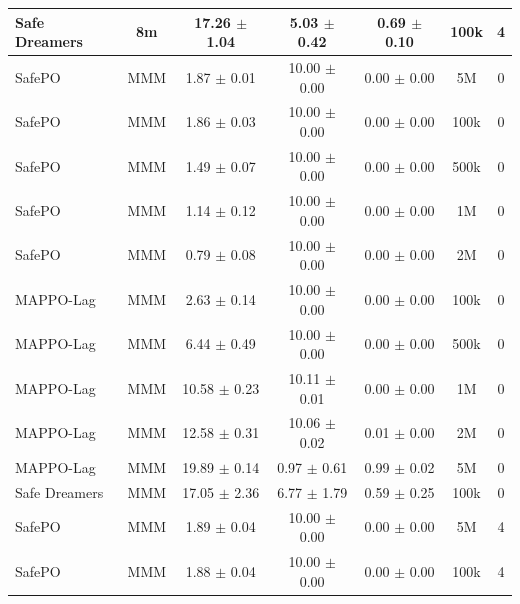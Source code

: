 \begin{longtable}{lcccccc}
Safe Dreamers & 8m & 17.26 $\pm$ 1.04 & 5.03 $\pm$ 0.42 & 0.69 $\pm$ 0.10 & 100k & 4 \\
\midrule
SafePO & MMM & \textcolor{green!60!black}{1.87 $\pm$ 0.01} & \textcolor{green!60!black}{1\textcolor{green!60!black}{0.00 $\pm$ 0.00}} & 0.00 $\pm$ 0.00 & 5M & 0 \\
SafePO & MMM & \textcolor{green!60!black}{1.86 $\pm$ 0.03} & \textcolor{green!60!black}{1\textcolor{green!60!black}{0.00 $\pm$ 0.00}} & 0.00 $\pm$ 0.00 & 100k & 0 \\
SafePO & MMM & \textcolor{green!60!black}{1.49 $\pm$ 0.07} & \textcolor{green!60!black}{1\textcolor{green!60!black}{0.00 $\pm$ 0.00}} & 0.00 $\pm$ 0.00 & 500k & 0 \\
SafePO & MMM & \textcolor{green!60!black}{1.14 $\pm$ 0.12} & \textcolor{green!60!black}{1\textcolor{green!60!black}{0.00 $\pm$ 0.00}} & 0.00 $\pm$ 0.00 & 1M & 0 \\
SafePO & MMM & \textcolor{green!60!black}{0.79 $\pm$ 0.08} & \textcolor{green!60!black}{1\textcolor{green!60!black}{0.00 $\pm$ 0.00}} & 0.00 $\pm$ 0.00 & 2M & 0 \\
MAPPO-Lag & MMM & \textcolor{green!60!black}{2.63 $\pm$ 0.14} & \textcolor{green!60!black}{1\textcolor{green!60!black}{0.00 $\pm$ 0.00}} & 0.00 $\pm$ 0.00 & 100k & 0 \\
MAPPO-Lag & MMM & \textcolor{green!60!black}{6.44 $\pm$ 0.49} & \textcolor{green!60!black}{1\textcolor{green!60!black}{0.00 $\pm$ 0.00}} & 0.00 $\pm$ 0.00 & 500k & 0 \\
MAPPO-Lag & MMM & \textcolor{green!60!black}{10.58 $\pm$ 0.23} & \textcolor{green!60!black}{10.11 $\pm$ 0.01} & \textcolor{green!60!black}{0.00 $\pm$ 0.00} & 1M & 0 \\
MAPPO-Lag & MMM & \textcolor{green!60!black}{12.58 $\pm$ 0.31} & \textcolor{green!60!black}{10.06 $\pm$ 0.02} & \textcolor{green!60!black}{0.01 $\pm$ 0.00} & 2M & 0 \\
MAPPO-Lag & MMM & \textcolor{red!70!black}{19.89 $\pm$ 0.14} & \textcolor{red!70!black}{0.97 $\pm$ 0.61} & \textcolor{red!70!black}{0.99 $\pm$ 0.02} & 5M & 0 \\
Safe Dreamers & MMM & 17.05 $\pm$ 2.36 & 6.77 $\pm$ 1.79 & 0.59 $\pm$ 0.25 & 100k & 0 \\
\midrule
SafePO & MMM & \textcolor{green!60!black}{1.89 $\pm$ 0.04} & \textcolor{green!60!black}{1\textcolor{green!60!black}{0.00 $\pm$ 0.00}} & 0.00 $\pm$ 0.00 & 5M & 4 \\
SafePO & MMM & \textcolor{green!60!black}{1.88 $\pm$ 0.04} & \textcolor{green!60!black}{1\textcolor{green!60!black}{0.00 $\pm$ 0.00}} & 0.00 $\pm$ 0.00 & 100k & 4 \\

\end{longtable}
